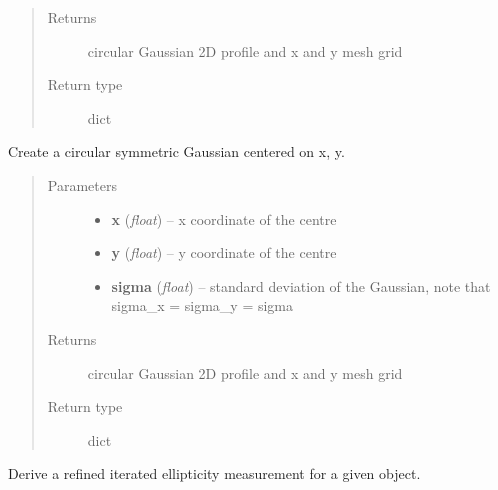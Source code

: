 \documentclass[a4paper,12pt,english]{sphinxmanual}
\begin{document}
\begin{fulllineitems}
\begin{fulllineitems}
\begin{quote}
\begin{description}
\item[{Returns}] \leavevmode
circular Gaussian 2D profile and x and y mesh grid

\item[{Return type}] \leavevmode
dict

\end{description}\end{quote}

\end{fulllineitems}


\begin{fulllineitems}
\label{analysis:analysis.shape.shapeMeasurement.circular2DGaussian}
Create a circular symmetric Gaussian centered on x, y.
\begin{quote}\begin{description}
\item[{Parameters}] \leavevmode\begin{itemize}
\item {} 
\textbf{x} (\emph{float}) -- x coordinate of the centre

\item {} 
\textbf{y} (\emph{float}) -- y coordinate of the centre

\item {} 
\textbf{sigma} (\emph{float}) -- standard deviation of the Gaussian, note that sigma\_x = sigma\_y = sigma

\end{itemize}

\item[{Returns}] \leavevmode
circular Gaussian 2D profile and x and y mesh grid

\item[{Return type}] \leavevmode
dict

\end{description}\end{quote}

\end{fulllineitems}


\begin{fulllineitems}
\label{analysis:analysis.shape.shapeMeasurement.measureRefinedEllipticity}
Derive a refined iterated ellipticity measurement for a given object.


\end{fulllineitems}
\end{fulllineitems}
\end{document}
